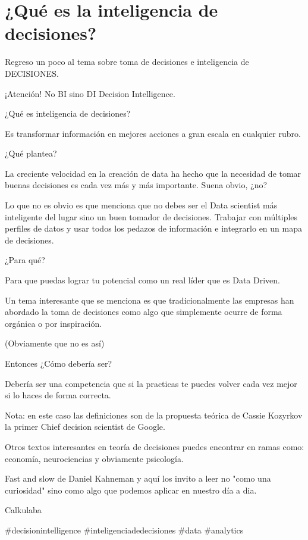 \chapter{¿Qué es la inteligencia de decisiones?}
\label{Cap1}
Regreso un poco al tema sobre toma de decisiones e inteligencia de DECISIONES. 


¡Atención! No BI sino DI Decision Intelligence. 


¿Qué es inteligencia de decisiones? 


Es transformar información en mejores acciones a gran escala en cualquier rubro. 


¿Qué plantea? 


La creciente velocidad en la creación de data ha hecho que la necesidad de tomar buenas decisiones es cada vez más y más importante. Suena obvio, ¿no? 


Lo que no es obvio es que menciona que no debes ser el Data scientist más inteligente del lugar sino un buen tomador de decisiones. Trabajar con múltiples perfiles de datos y usar todos los pedazos de información e integrarlo en un mapa de decisiones. 


¿Para qué?


Para que puedas lograr tu potencial como un real líder que es Data Driven. 


Un tema interesante que se menciona es que tradicionalmente las empresas han abordado la toma de decisiones como algo que simplemente ocurre de forma orgánica o por inspiración. 


(Obviamente que no es así)


Entonces ¿Cómo debería ser?


Debería ser una competencia que si la practicas te puedes volver cada vez mejor si lo haces de forma correcta. 


Nota: en este caso las definiciones son de la propuesta teórica de Cassie Kozyrkov la primer Chief decision scientist de Google. 


Otros textos interesantes en teoría de decisiones puedes encontrar en ramas como: economía, neurociencias y obviamente psicología. 


Fast and slow de Daniel Kahneman y aquí los invito a leer no "como una curiosidad" sino como algo que podemos aplicar en  nuestro día a dia. 


Calkulaba


#decisionintelligence #inteligenciadedecisiones #data #analytics
